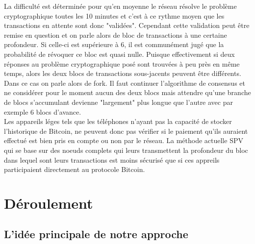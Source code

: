 \documentclass[12pt,a4paper]{article}
\begin{document}
	La difficulté est déterminée pour qu'en moyenne le réseau résolve le problème cryptographique toutes les 10 minutes et c'est à ce rythme moyen que les transactions en attente sont donc "validées". Cependant cette validation peut être remise en question et on parle alors de bloc de transactions à une certaine profondeur. Si celle-ci est supérieure à 6, il est communément jugé que la probabilité de révoquer ce bloc est quasi nulle. Puisque effectivement si deux réponses au problème cryptographique posé sont trouvées à peu près en même temps, alors les deux blocs de transactions sous-jacents peuvent être différents. Dans ce cas on parle alors de fork. Il faut continuer l'algorithme de consensus et ne considérer pour le moment aucun des deux blocs mais attendre qu'une branche de blocs s'accumulant devienne "largement" plus longue que l'autre avec par exemple 6 blocs d'avance.\\ %
	Les appareils léges tels que les téléphones n'ayant pas la capacité de stocker l'historique de Bitcoin, ne peuvent donc pas vérifier si le paiement qu'ils auraient effectué est bien pris en compte ou non par le réseau. La méthode actuelle SPV qui se base sur des noeuds complets qui leurs transmettent la profondeur du bloc dans lequel sont leurs transactions est moins sécurisé que si ces appreils participaient directement au protocole Bitcoin. %
		
	\section{Déroulement} %
	
	\subsection{L'idée principale de notre approche} %
	
\end{document}
